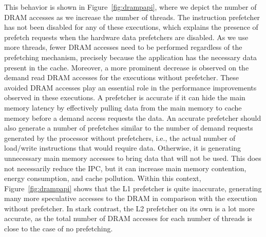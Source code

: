\documentclass[AMA,final,STIX1COL]{WileyNJD-v2}
\newcommand{\ms}[1]{\textcolor{orange}{\bfseries \ul{ msserpa: #1} }\vspace{0.2cm}}
\newcommand{\fbm}[1]{\textcolor{red}{\bfseries \ul{fbm: #1} }\vspace{0.2cm}}
\begin{document}
This behavior is shown in Figure~\ref{fig:drampapi}, where we depict the number of DRAM accesses as we increase the number of threads.
The instruction prefetcher has not been disabled for any of these executions, which explains the presence of prefetch requests when the hardware data prefetchers are disabled.
As we use more threads, fewer DRAM accesses need to be performed regardless of the prefetching mechanism, precisely because the application has the necessary data present in the cache.
Moreover, a more prominent decrease is observed on the demand read DRAM accesses for the executions without prefetcher.
These avoided DRAM accesses play an essential role in the performance improvements observed in these executions.
A prefetcher is accurate if it can hide the main memory latency by effectively pulling data from the main memory to cache memory before a demand access requests the data.
An accurate prefetcher should also generate a number of prefetches similar to the number of demand requests generated by the processor without prefetchers, i.e., the actual number of load/write instructions that would require data.
Otherwise, it is generating unnecessary main memory accesses to bring data that will not be used.
This does not necessarily reduce the IPC, but it can increase main memory contention, energy consumption, and cache pollution.
Within this context, Figure~\ref{fig:drampapi} shows that the L1 prefetcher is quite inaccurate, generating many more speculative accesses to the DRAM in comparison with the execution without prefetcher. %
In stark contrast, the L2 prefetcher on its own is a lot more accurate, as the total number of DRAM accesses for each number of threads is close to the case of no prefetching. 
\end{document}
